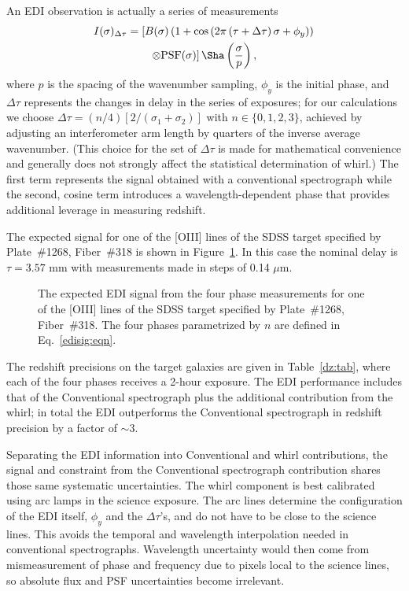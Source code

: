\documentclass[preprint2, 10pt]{aastex}
\begin{document}
An EDI observation is actually a series of measurements
\begin{align}
I(\sigma)_{\Delta\tau} &= \left[B(\sigma)\left(1+\cos{\left(2\pi\left(\tau+\Delta \tau\right)\sigma+\phi_y \right)} \right) \right. \nonumber\\
&\qquad \left. \otimes \mbox{PSF}(\sigma)\right]\Sha\left(\frac{\sigma}{p}\right),
\label{edisig:eqn}
\end{align}
where $p$ is the spacing of the wavenumber sampling, $\phi_y$ is the initial phase,
and $\Delta \tau$ represents the changes in delay in the series of exposures; for our calculations we choose  $\Delta \tau = (n/4)[2/(\sigma_1+\sigma_2)]$ with $n\in\{0,1,2,3\}$, 
achieved by adjusting an interferometer arm length by quarters 
of the inverse average wavenumber. 
(This choice for the set of  $\Delta \tau$ is made for mathematical convenience and generally does not strongly affect the statistical determination of whirl.) 
The first term represents the signal obtained with a conventional spectrograph while the second, cosine term
introduces a wavelength-dependent phase that provides additional leverage in measuring redshift.


The expected signal for one of the [OIII] lines of the SDSS target specified by Plate~\#1268, Fiber~\#318 is shown
in Figure~\ref{edicounts:fig}.   In this case the nominal delay is $\tau = 3.57$ mm with measurements
made in steps of 0.14 $\mu$m.


\begin{figure}[t]
   \centering
   \caption{The expected EDI signal from the four phase measurements for one of the [OIII] lines of
   the SDSS target specified by Plate~\#1268, Fiber~\#318. The four phases parametrized by $n$ are defined in Eq.~\ref{edisig:eqn}.
\label{edicounts:fig}}
\end{figure}


The redshift precisions on the target galaxies are given in Table~\ref{dz:tab}, where each of the four phases receives
a 2-hour exposure.  The EDI performance includes that of the Conventional spectrograph plus
the additional contribution from the whirl; in total the EDI outperforms the Conventional spectrograph
in redshift precision by a factor of $\sim 3$.

Separating the EDI information into Conventional and whirl contributions,
the signal and constraint from the Conventional spectrograph contribution shares those same systematic uncertainties.
The whirl component is best calibrated using arc lamps in the science exposure.  The arc lines determine the configuration
of the EDI itself, $\phi_y$ and the $\Delta \tau$'s, and do not have to be close
to the science lines.  This avoids the temporal and wavelength interpolation needed in conventional spectrographs.
Wavelength uncertainty would then come from mismeasurement of phase and frequency due to pixels local to the
science lines, so absolute flux and PSF uncertainties become irrelevant. 
\end{document}
